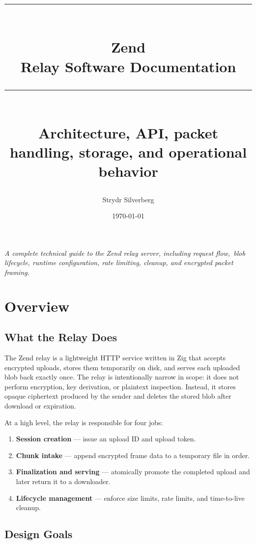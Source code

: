 \documentclass[11pt,a4paper]{report}
\title{%
    \vspace{-1cm}
    \rule{\textwidth}{1pt}\\[0.5cm]
    {\Huge\bfseries Zend}\\[0.3cm]
    {\Large Relay Software Documentation}\\[0.3cm]
    \rule{\textwidth}{1pt}\\[1cm]
    {\large Architecture, API, packet handling, storage, and operational behavior}
}
\author{Strydr Silverberg}
\date{\today}
\begin{document}
\maketitle
\thispagestyle{empty}

\vfill
\begin{center}
    \textit{A complete technical guide to the Zend relay server, including request flow,\
    blob lifecycle, runtime configuration, rate limiting, cleanup, and encrypted packet framing.}
\end{center}
\vfill

\newpage
\tableofcontents
\newpage

\chapter{Overview}

\section{What the Relay Does}

The Zend relay is a lightweight HTTP service written in Zig that accepts encrypted uploads, stores them temporarily on disk, and serves each uploaded blob back exactly once. The relay is intentionally narrow in scope: it does not perform encryption, key derivation, or plaintext inspection. Instead, it stores opaque ciphertext produced by the sender and deletes the stored blob after download or expiration.

At a high level, the relay is responsible for four jobs:

\begin{enumerate}
    \item \textbf{Session creation} --- issue an upload ID and upload token.
    \item \textbf{Chunk intake} --- append encrypted frame data to a temporary file in order.
    \item \textbf{Finalization and serving} --- atomically promote the completed upload and later return it to a downloader.
    \item \textbf{Lifecycle management} --- enforce size limits, rate limits, and time-to-live cleanup.
\end{enumerate}

\section{Design Goals}
\end{document}
